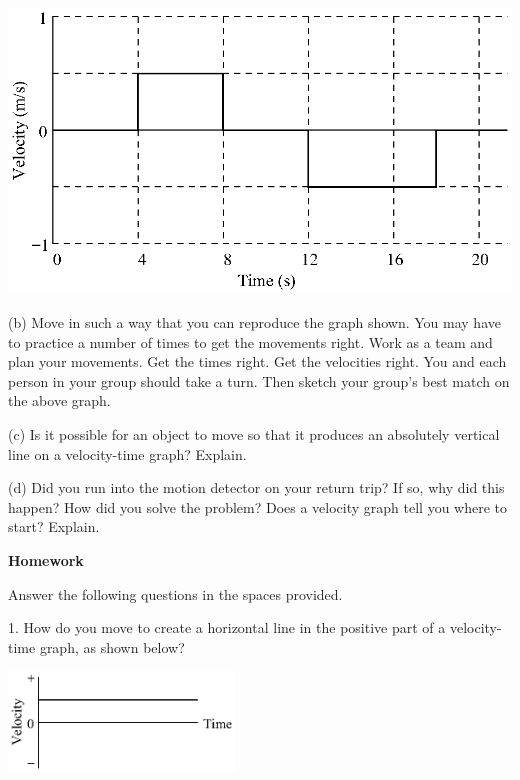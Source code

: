 \vspace{0.3cm}
{\par\centering \includegraphics{velocity/velocity_fig7.eps} \par}
\vspace{0.3cm}

\answerspace{25mm}
(b) Move in such a way that you can reproduce the graph shown. You may have
to practice a number of times to get the movements right. Work as a team and
plan your movements. Get the times right. Get the velocities right. You and
each person in your group should take a turn. Then sketch your group's best
match on the above graph.

(c) Is it possible for an object to move so that it produces an absolutely vertical
line on a velocity-time graph? Explain.
\answerspace{25mm}

(d) Did you run into the motion detector on your return trip? If so, why did
this happen? How did you solve the problem? Does a velocity graph tell you where
to start? Explain.
\answerspace{25mm}

\pagebreak[2]
\textbf{Homework} 

Answer the following questions in the spaces provided.

1. How do you move to create a horizontal line in the positive part of a velocity-time
graph, as shown below?

\vspace{0.3cm}
{\par\raggedright \includegraphics[width=0.45\textwidth]{velocity/velocity_fig8.eps} \par}
\answerspace{0.3cm}

